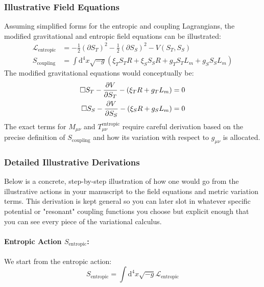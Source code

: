 \documentclass[11pt,a4paper]{article} %
\newcommand{\ST}{S_T}
\newcommand{\SSp}{S_S} %
\newcommand{\Scoupling}{S_{\text{coupling}}}
\newcommand{\Sentropic}{S_{\text{entropic}}}
\newcommand{\Lm}{L_m}
\newcommand{\Mmu}{M} %
\newcommand{\Tmnentropic}{T^{\text{entropic}}_{\mu\nu}}
\begin{document}
\subsubsection{Illustrative Field Equations}
Assuming simplified forms for the entropic and coupling Lagrangians, the modified gravitational and entropic field equations can be illustrated:
\begin{align*}
\mathcal{L}_{\text{entropic}}&=-\frac{1}{2}(\partial\ST)^2-\frac{1}{2}(\partial\SSp)^2-V(\ST,\SSp)\\
\Scoupling&=\int\text{d}^4x\sqrt{-g}(\xi_T\ST R+\xi_S\SSp R+g_T\ST\Lm+g_S\SSp\Lm)
\end{align*}
The modified gravitational equations would conceptually be:
\begin{align*}
\Box\ST-\pdv{V}{\ST}-(\xi_T R+g_T\Lm)&=0\\
\Box\SSp-\pdv{V}{\SSp}-(\xi_S R+g_S\Lm)&=0
\end{align*}
The exact terms for $\Mmu_{\mu\nu}$ and $\Tmnentropic$ require careful derivation based on the precise definition of $\Scoupling$ and how its variation with respect to $g_{\mu\nu}$ is allocated.

\subsubsection{Detailed Illustrative Derivations}
Below is a concrete, step-by-step illustration of how one would go from the illustrative actions in your manuscript to the field equations and metric variation terms. This derivation is kept general so you can later slot in whatever specific potential or "resonant" coupling functions you choose but explicit enough that you can see every piece of the variational calculus.

\paragraph{Entropic Action $\Sentropic$:}
We start from the entropic action:
\begin{equation*}
\Sentropic=\int\text{d}^4x\sqrt{-g}\mathcal{L}_{\text{entropic}}
\end{equation*}
\end{document}
